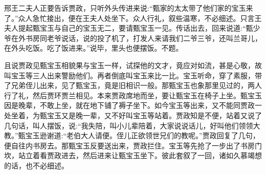 \begin{parag}
    邢王二夫人正要告诉贾政，只听外头传进来说:“甄家的太太带了他们家的宝玉来了。”众人急忙接出，便在王夫人处坐下。众人行礼，叙些温寒，不必细述。只言王夫人提起甄宝玉与自己的宝玉无二，要请甄宝玉一见。传话出去，回来说道:“甄少爷在外书房同老爷说话，说的投了机了，打发人来请我们二爷三爷，还叫兰哥儿，在外头吃饭。吃了饭进来。”说毕，里头也便摆饭。不题。
\end{parag}


\begin{parag}
    且说贾政见甄宝玉相貌果与宝玉一样，试探他的文才，竟应对如流，甚是心敬，故叫宝玉等三人出来警励他们。再者倒底叫宝玉来比一比。宝玉听命，穿了素服，带了兄弟侄儿出来，见了甄宝玉，竟是旧相识一般。那甄宝玉也象那里见过的，两人行了礼，然后贾环贾兰相见。本来贾政席地而坐，要让甄宝玉在椅子上坐。甄宝玉因是晚辈，不敢上坐，就在地下铺了褥子坐下。如今宝玉等出来，又不能同贾政一处坐着，为甄宝玉又是晚一辈，又不好叫宝玉等站着。贾政知是不便，站着又说了几句话，叫人摆饭，说:“我失陪，叫小儿辈陪着，大家说说话儿，好叫他们领领大教。”甄宝玉逊谢道:“老伯大人请便。侄儿正欲领世兄们的教呢。”贾政回复了几句，便自往内书房去。那甄宝玉反要送出来，贾政拦住。宝玉等先抢了一步出了书房门坎，站立着看贾政进去，然后进来让甄宝玉坐下。彼此套叙了一回，诸如久慕竭想的话，也不必细述。
\end{parag}


